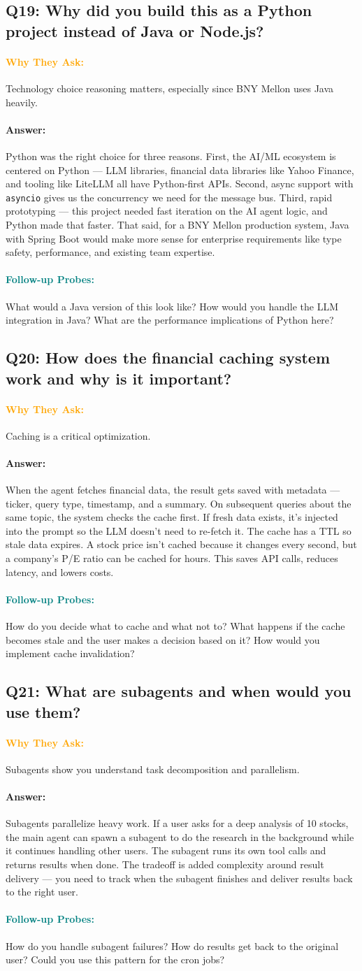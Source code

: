 \documentclass[11pt,a4paper]{article}
\newcommand{\Q}[1]{\subsection{#1}}
\newcommand{\Ans}[1]{\paragraph{\textbf{Answer:}} #1}
\newcommand{\Why}{\paragraph{\textcolor{orange}{\textbf{Why They Ask:}}}}
\newcommand{\Probe}{\paragraph{\textcolor{teal}{\textbf{Follow-up Probes:}}}}
\begin{document}
\Q{Q19: Why did you build this as a Python project instead of Java or Node.js?}
\Why Technology choice reasoning matters, especially since BNY Mellon uses Java heavily.
\Ans Python was the right choice for three reasons. First, the AI/ML ecosystem is centered on Python --- LLM libraries, financial data libraries like Yahoo Finance, and tooling like LiteLLM all have Python-first APIs. Second, async support with \texttt{asyncio} gives us the concurrency we need for the message bus. Third, rapid prototyping --- this project needed fast iteration on the AI agent logic, and Python made that faster. That said, for a BNY Mellon production system, Java with Spring Boot would make more sense for enterprise requirements like type safety, performance, and existing team expertise.
\Probe What would a Java version of this look like? How would you handle the LLM integration in Java? What are the performance implications of Python here?

\Q{Q20: How does the financial caching system work and why is it important?}
\Why Caching is a critical optimization.
\Ans When the agent fetches financial data, the result gets saved with metadata --- ticker, query type, timestamp, and a summary. On subsequent queries about the same topic, the system checks the cache first. If fresh data exists, it's injected into the prompt so the LLM doesn't need to re-fetch it. The cache has a TTL so stale data expires. A stock price isn't cached because it changes every second, but a company's P/E ratio can be cached for hours. This saves API calls, reduces latency, and lowers costs.
\Probe How do you decide what to cache and what not to? What happens if the cache becomes stale and the user makes a decision based on it? How would you implement cache invalidation?

\Q{Q21: What are subagents and when would you use them?}
\Why Subagents show you understand task decomposition and parallelism.
\Ans Subagents parallelize heavy work. If a user asks for a deep analysis of 10 stocks, the main agent can spawn a subagent to do the research in the background while it continues handling other users. The subagent runs its own tool calls and returns results when done. The tradeoff is added complexity around result delivery --- you need to track when the subagent finishes and deliver results back to the right user.
\Probe How do you handle subagent failures? How do results get back to the original user? Could you use this pattern for the cron jobs?
\end{document}
